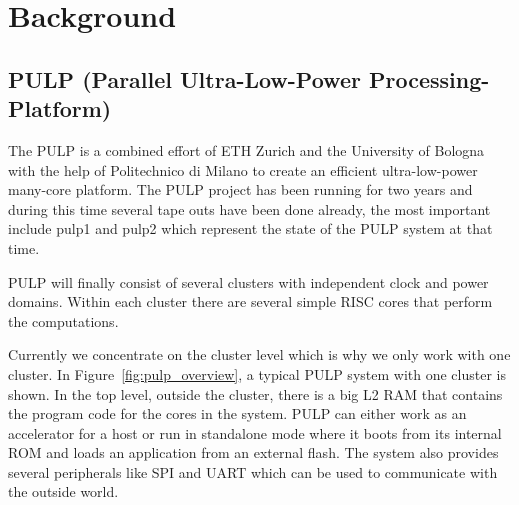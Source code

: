 
\chapter{Background}
\label{chapter:background}

\section{PULP (Parallel Ultra-Low-Power Processing-Platform)}

The \gls{PULP} is a combined effort of ETH Zurich and the University of Bologna
with the help of Politechnico di Milano to create an efficient ultra-low-power
many-core platform. The \gls{PULP} project has been running for two years and
during this time several tape outs have been done already, the most important
include pulp1 and pulp2 which represent the state of the \gls{PULP} system at
that time.

\gls{PULP} will finally consist of several clusters with independent clock and
power domains. Within each cluster there are several simple \gls{RISC} cores
that perform the computations.

Currently we concentrate on the cluster level which is why we only work with one
cluster. In Figure~\ref{fig:pulp_overview}, a typical \gls{PULP} system with one
cluster is shown. In the top level, outside the cluster, there is a big L2
\gls{RAM} that contains the program code for the cores in the system.
\gls{PULP} can either work as an accelerator for a host or run in standalone
mode where it boots from its internal \gls{ROM} and loads an application from an
external flash. The system also provides several peripherals like \gls{SPI} and
\gls{UART} which can be used to communicate with the outside world.

